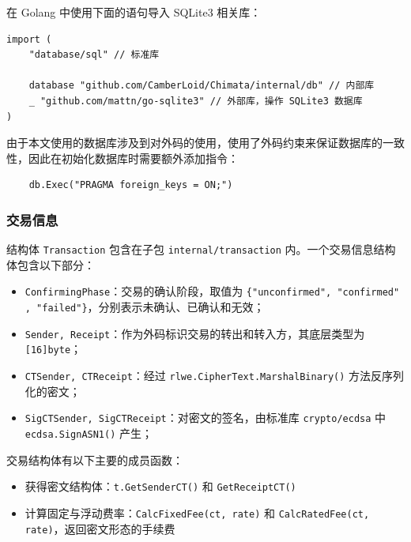 在 Golang 中使用下面的语句导入 SQLite3 相关库：

\begin{verbatim}
import (
    "database/sql" // 标准库
    
    database "github.com/CamberLoid/Chimata/internal/db" // 内部库
    _ "github.com/mattn/go-sqlite3" // 外部库，操作 SQLite3 数据库
)
\end{verbatim}

由于本文使用的数据库涉及到对外码的使用，使用了外码约束来保证数据库的一致性，因此在初始化数据库时需要额外添加指令：

\begin{verbatim}
    db.Exec("PRAGMA foreign_keys = ON;")
\end{verbatim}

\subsubsection*{交易信息}

结构体 \verb|Transaction| 包含在子包 \verb|internal/transaction| 内。一个交易信息结构体包含以下部分：

\begin{itemize}
    \item \verb|ConfirmingPhase|：交易的确认阶段，取值为 \verb|{"unconfirmed", "confirmed"|\\
    \verb|, "failed"}|，分别表示未确认、已确认和无效；
    \item \verb|Sender, Receipt|：作为外码标识交易的转出和转入方，其底层类型为 \verb|[16]byte|；
    \item \verb|CTSender, CTReceipt|：经过 \verb|rlwe.CipherText.MarshalBinary()| 方法反序列化的密文；
    \item \verb|SigCTSender, SigCTReceipt|：对密文的签名，由标准库 \verb|crypto/ecdsa| 中 \verb|ecdsa.SignASN1()| 产生；
\end{itemize}

交易结构体有以下主要的成员函数：

\begin{itemize}
    \item 获得密文结构体：\texttt{t.GetSenderCT()} 和 \texttt{GetReceiptCT()}
    \item 计算固定与浮动费率：\texttt{CalcFixedFee(ct, rate)} 和 \texttt{CalcRatedFee(ct, rate)}，返回密文形态的手续费
\end{itemize}


